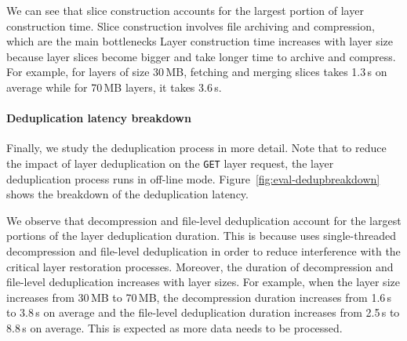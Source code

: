 We can see that slice construction accounts for the largest portion of layer construction time.
%
Slice construction involves file archiving and compression, which are the main bottlenecks
Layer construction time increases with layer size because layer slices become bigger and
take longer time to archive and compress.
%
For example, for layers of size 30\,MB, fetching and merging slices takes 1.3\,s on average while
for 70\,MB layers, it takes 3.6\,s.

\paragraph{Deduplication latency breakdown}
%
Finally, we study the deduplication process in more detail.
%
Note that to reduce the impact of layer deduplication on the \texttt{GET} layer request,
the layer deduplication process runs in off-line mode.
%
Figure~\ref{fig:eval-dedupbreakdown} shows the breakdown of the deduplication latency.

We observe that decompression and file-level deduplication account for the largest portions of
the layer deduplication duration.
%
%
This is because \sysname uses single-threaded decompression and file-level deduplication in
order to reduce interference with the critical layer restoration processes.
%
%
Moreover, the duration of decompression and file-level deduplication increases with layer sizes.
%
For example, when the layer size increases from 30\,MB to 70\,MB, 
the decompression duration increases from 1.6\,s to 3.8\,s on average and the file-level deduplication duration increases from 2.5\,s to 8.8\,s on average.
%
This is expected as more data needs to be processed.


